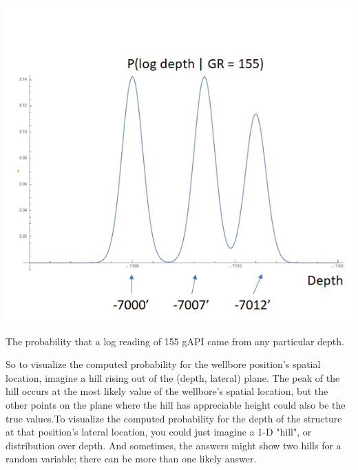 \documentclass{tufte-handout}
\begin{document}
\begin{marginfigure}
  \includegraphics{probability-density-for-155-gapi.png}
  \caption{The probability that a log reading of 155 gAPI came from any particular depth.}
  \label{fig:probability-density-for-155-gapi}
\end{marginfigure}



So to visualize the computed probability for the wellbore position's spatial location,
imagine a hill rising out of the (depth, lateral) plane. The peak of the hill occurs at the
most likely value of the wellbore's spatial location, but the other points on the plane where
the hill has appreciable height could also be the true values.To visualize the computed
probability for the depth of the structure at that position's lateral location, you could
just imagine a 1-D "hill", or distribution over depth. And sometimes, the answers might show
two hills for a random variable; there can be more than one likely answer.
\end{document}
